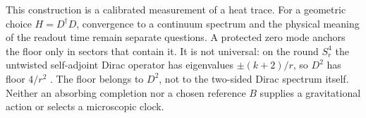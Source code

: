 This construction is a calibrated measurement of a heat trace.
For a geometric choice $H=D^\dagger D$, convergence to a continuum spectrum
and the physical meaning of the readout time remain separate questions.
A protected zero mode anchors the floor only in sectors that contain it.
It is not universal: on the round $S^4_r$ the untwisted self-adjoint Dirac
operator has eigenvalues $\pm(k+2)/r$, so $D^2$ has floor $4/r^2$
\cite{Camporesi}.
The floor belongs to $D^2$, not to the two-sided Dirac spectrum itself.
Neither an absorbing completion nor a chosen reference $B$ supplies a
gravitational action or selects a microscopic clock.
